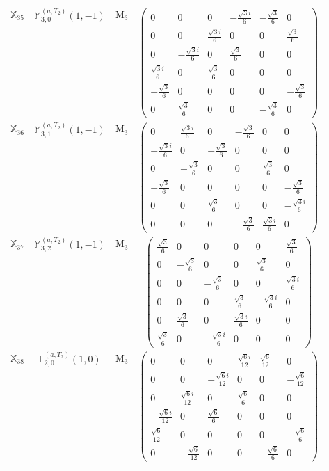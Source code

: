 \documentclass[fleqn,10pt,landscape]{article}
\begin{document}
\begin{itemize}
\begin{center}
\begin{longtable}{c|c|c|c}
$ \mathbb{X}_{35} $ & $\mathbb{M}_{3,0}^{(a,T_{2})}(1,-1)$ & M$_{3}$ & $\begin{pmatrix} 0 & 0 & 0 & - \frac{\sqrt{3} i}{6} & - \frac{\sqrt{3}}{6} & 0 \\ 0 & 0 & \frac{\sqrt{3} i}{6} & 0 & 0 & \frac{\sqrt{3}}{6} \\ 0 & - \frac{\sqrt{3} i}{6} & 0 & \frac{\sqrt{3}}{6} & 0 & 0 \\ \frac{\sqrt{3} i}{6} & 0 & \frac{\sqrt{3}}{6} & 0 & 0 & 0 \\ - \frac{\sqrt{3}}{6} & 0 & 0 & 0 & 0 & - \frac{\sqrt{3}}{6} \\ 0 & \frac{\sqrt{3}}{6} & 0 & 0 & - \frac{\sqrt{3}}{6} & 0 \end{pmatrix}$ \\
$ \mathbb{X}_{36} $ & $\mathbb{M}_{3,1}^{(a,T_{2})}(1,-1)$ & M$_{3}$ & $\begin{pmatrix} 0 & \frac{\sqrt{3} i}{6} & 0 & - \frac{\sqrt{3}}{6} & 0 & 0 \\ - \frac{\sqrt{3} i}{6} & 0 & - \frac{\sqrt{3}}{6} & 0 & 0 & 0 \\ 0 & - \frac{\sqrt{3}}{6} & 0 & 0 & \frac{\sqrt{3}}{6} & 0 \\ - \frac{\sqrt{3}}{6} & 0 & 0 & 0 & 0 & - \frac{\sqrt{3}}{6} \\ 0 & 0 & \frac{\sqrt{3}}{6} & 0 & 0 & - \frac{\sqrt{3} i}{6} \\ 0 & 0 & 0 & - \frac{\sqrt{3}}{6} & \frac{\sqrt{3} i}{6} & 0 \end{pmatrix}$ \\
$ \mathbb{X}_{37} $ & $\mathbb{M}_{3,2}^{(a,T_{2})}(1,-1)$ & M$_{3}$ & $\begin{pmatrix} \frac{\sqrt{3}}{6} & 0 & 0 & 0 & 0 & \frac{\sqrt{3}}{6} \\ 0 & - \frac{\sqrt{3}}{6} & 0 & 0 & \frac{\sqrt{3}}{6} & 0 \\ 0 & 0 & - \frac{\sqrt{3}}{6} & 0 & 0 & \frac{\sqrt{3} i}{6} \\ 0 & 0 & 0 & \frac{\sqrt{3}}{6} & - \frac{\sqrt{3} i}{6} & 0 \\ 0 & \frac{\sqrt{3}}{6} & 0 & \frac{\sqrt{3} i}{6} & 0 & 0 \\ \frac{\sqrt{3}}{6} & 0 & - \frac{\sqrt{3} i}{6} & 0 & 0 & 0 \end{pmatrix}$ \\
$ \mathbb{X}_{38} $ & $\mathbb{T}_{2,0}^{(a,T_{2})}(1,0)$ & M$_{3}$ & $\begin{pmatrix} 0 & 0 & 0 & \frac{\sqrt{6} i}{12} & \frac{\sqrt{6}}{12} & 0 \\ 0 & 0 & - \frac{\sqrt{6} i}{12} & 0 & 0 & - \frac{\sqrt{6}}{12} \\ 0 & \frac{\sqrt{6} i}{12} & 0 & \frac{\sqrt{6}}{6} & 0 & 0 \\ - \frac{\sqrt{6} i}{12} & 0 & \frac{\sqrt{6}}{6} & 0 & 0 & 0 \\ \frac{\sqrt{6}}{12} & 0 & 0 & 0 & 0 & - \frac{\sqrt{6}}{6} \\ 0 & - \frac{\sqrt{6}}{12} & 0 & 0 & - \frac{\sqrt{6}}{6} & 0 \end{pmatrix}$ \\

\end{longtable}
\end{center}
\end{itemize}
\end{document}
